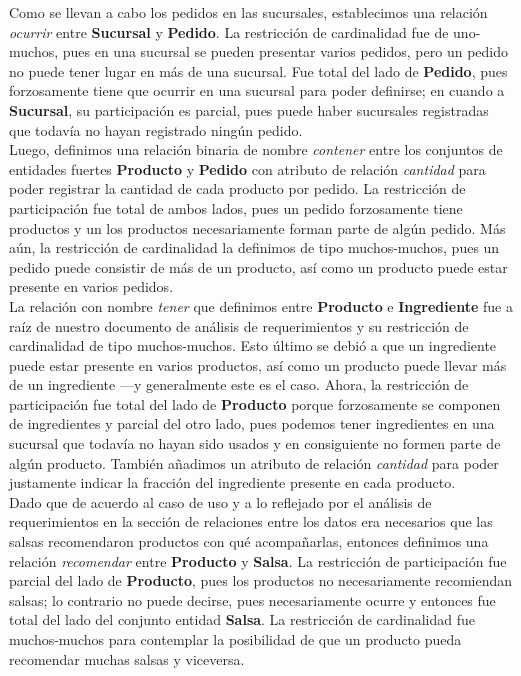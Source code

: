 \documentclass[11pt,letterpaper]{article}
\begin{document}
Como se llevan a cabo los pedidos en las sucursales, establecimos una relación \textit{ocurrir} entre \textbf{Sucursal} y \textbf{Pedido}. La restricción de cardinalidad fue de uno-muchos, pues en una sucursal se pueden presentar varios pedidos, pero un pedido no puede tener lugar en más de una sucursal. Fue total del lado de \textbf{Pedido}, pues forzosamente tiene que ocurrir en una sucursal para poder definirse; en cuando a \textbf{Sucursal}, su participación es parcial, pues puede haber sucursales registradas que todavía no hayan registrado ningún pedido. \\

Luego, definimos una relación binaria de nombre \textit{contener} entre los conjuntos de entidades  fuertes \textbf{Producto} y \textbf{Pedido} con atributo de relación \textit{cantidad} para poder registrar la cantidad de cada producto por pedido. La restricción de participación fue total de ambos lados, pues un pedido forzosamente tiene productos y un los productos necesariamente forman parte de algún pedido. Más aún, la restricción de cardinalidad la definimos de tipo muchos-muchos, pues un pedido puede consistir de más de un producto, así como un producto puede estar presente en varios pedidos.\\

La relación con nombre \textit{tener} que definimos entre \textbf{Producto} e \textbf{Ingrediente} fue a raíz de nuestro documento de análisis de requerimientos y su restricción de cardinalidad de tipo muchos-muchos. Esto último se debió a que un ingrediente puede estar presente en varios productos, así como un producto puede llevar más de un ingrediente ---y generalmente este es el caso. Ahora, la restricción de participación fue total del lado de \textbf{Producto} porque forzosamente se componen de ingredientes y parcial del otro lado, pues podemos tener ingredientes en una sucursal que todavía no hayan sido usados y en consiguiente no formen parte de algún producto. También añadimos un atributo de relación \textit{cantidad} para poder justamente indicar la fracción del ingrediente presente en cada producto.\\

Dado que de acuerdo al caso de uso y a lo reflejado por el análisis de requerimientos en la sección de relaciones entre los datos era necesarios que las salsas recomendaron productos con qué acompañarlas, entonces definimos una relación \textit{recomendar} entre \textbf{Producto} y \textbf{Salsa}. La restricción de participación fue parcial del lado de \textbf{Producto}, pues los productos no necesariamente recomiendan salsas; lo contrario no puede decirse, pues necesariamente ocurre y entonces fue total del lado del conjunto entidad \textbf{Salsa}. La restricción de cardinalidad fue muchos-muchos para contemplar la posibilidad de que un producto pueda recomendar muchas salsas y viceversa. \\
\end{document}
